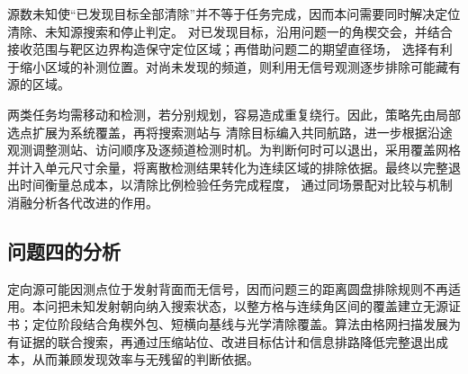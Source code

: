 源数未知使“已发现目标全部清除”并不等于任务完成，因而本问需要同时解决定位清除、未知源搜索和停止判定。
对已发现目标，沿用问题一的角楔交会，并结合接收范围与靶区边界构造保守定位区域；再借助问题二的期望直径场，
选择有利于缩小区域的补测位置。对尚未发现的频道，则利用无信号观测逐步排除可能藏有源的区域。

两类任务均需移动和检测，若分别规划，容易造成重复绕行。因此，策略先由局部选点扩展为系统覆盖，再将搜索测站与
清除目标编入共同航路，进一步根据沿途观测调整测站、访问顺序及逐频道检测时机。为判断何时可以退出，采用覆盖网格
并计入单元尺寸余量，将离散检测结果转化为连续区域的排除依据。最终以完整退出时间衡量总成本，以清除比例检验任务完成程度，
通过同场景配对比较与机制消融分析各代改进的作用。

\subsection{问题四的分析}

定向源可能因测点位于发射背面而无信号，因而问题三的距离圆盘排除规则不再适用。本问把未知发射朝向纳入搜索状态，以整方格与连续角区间的覆盖建立无源证书；定位阶段结合角楔外包、短横向基线与光学清除覆盖。算法由格网扫描发展为有证据的联合搜索，再通过压缩站位、改进目标估计和信息排路降低完整退出成本，从而兼顾发现效率与无残留的判断依据。
